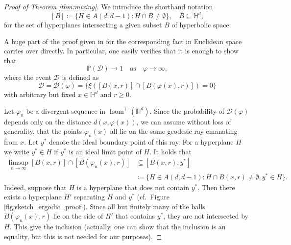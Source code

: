 \documentclass[12pt,a4paper]{article}
\theoremstyle{definition}
\renewcommand{\H}{\mathbb{H}}
\renewcommand{\P}{\mathbb{P}}
\DeclareMathOperator{\Isom}{Isom}
\begin{document}
\begin{proof}[Proof of Theorem \ref{thm:mixing}]
    We introduce the shorthand notation
    \[ [B] \coloneqq \{H \in A(d,d-1) \colon H \cap B \neq \emptyset\}, \quad B \subseteq \H^d, \]
    for the set of hyperplanes intersecting a given subset \(B\) of hyperbolic space.
    
    A huge part of the proof given in \cite[Theorem 7.1.4]{HS} for the corresponding fact in Euclidean space carries over directly.
    In particular, one easily verifies that it is enough to show that
    \begin{equation}\label{eq:mixing_proof}
        \P(\mathcal{D}) \to 1 \quad \text{as} \quad \varphi \to \infty,
    \end{equation}
    where the event \(\mathcal D\) is defined as
    \[ \mathcal{D} = \mathcal{D}(\varphi) = \{\xi([B(x,r)] \cap [B(\varphi(x),r)]) = 0\} \]
    with arbitrary but fixed \(x \in \H^d\) and \(r \geq 0\).

    Let \(\varphi_n\) be a divergent sequence in \(\Isom^+(\H^d)\).
    Since the probability of \(\mathcal{D}(\varphi)\) depends only on the distance \(d(x,\varphi(x))\), we can assume without loss of generality, that the points \(\varphi_n(x)\) all lie on the same geodesic ray emanating from \(x\).
    Let \(y^*\) denote the ideal boundary point of this ray.
    For a hyperplane $H$ we write $y^* \in H$ if $y^*$ is an ideal limit point of $H$.
    It holds that
    \begin{align*}
        \limsup_{n\to \infty}[B(x,r)] \cap [B(\varphi_n(x),r)]
            &\subseteq [B(x,r),y^*]\\
            &\coloneqq\{H \in A(d,d-1) \colon H \cap B(x,r) \neq \emptyset, y^* \in H\}.
    \end{align*}
    Indeed, suppose that \(H\) is a hyperplane that does not contain \(y^*\).
    Then there exists a hyperplane \(H'\) separating \(H\) and \(y^*\) (cf.~Figure \ref{fig:sketch_ergodic_proof}).
    Since all but finitely many of the balls \(B(\varphi_n(x),r)\) lie on the side of \(H'\) that contains \(y^*\), they are not intersected by \(H\).
    This give the inclusion (actually, one can show that the inclusion is an equality, but this is not needed for our purposes).
    

\end{proof}
\end{document}
